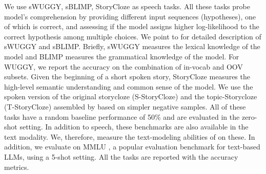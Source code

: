 We use sWUGGY, sBLIMP, StoryCloze as speech tasks. 
All these tasks probe model's comprehension
by providing different input sequences (hypotheses), one of which is correct, and assessing if the model assigns higher log-likelihood to the correct hypothesis among multiple choices.
We point to \citet{nguyen2020zero} for detailed description of sWUGGY and sBLIMP. Briefly, sWUGGY measures the lexical knowledge of the model and  BLIMP measures the grammatical knowledge of the model.
For WUGGY, we report the accuracy on the combination of in-vocab and OOV subsets.
Given the beginning of a short spoken story, StoryCloze measures %
the high-level semantic understanding and common sense \citep{mostafazadeh-etal-2017-lsdsem} of the model. We use the spoken version of the original storycloze (S-StoryCloze) and the topic-Storycloze (T-StoryCloze) assembled by \citet{hassid2023textually} based on simpler negative samples. All of these tasks have a random baseline performance of 50\% and are evaluated in the zero-shot setting. %
In addition to speech, these benchmarks are also available in the text modality. We, therefore, measure the text-modeling abilities of \spot on these. In addition, we evaluate \spot on MMLU \citep{hendrycks2021mmlu}, a popular evaluation benchmark for text-based LLMs, using a 5-shot setting.
All the tasks are reported with the accuracy metrics.

